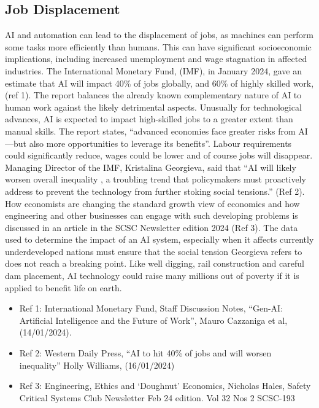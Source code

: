 \subsection{Job Displacement}
AI and automation can lead to the displacement of jobs, as machines can perform some tasks more efficiently than humans. This can have significant socioeconomic implications, including increased unemployment and wage stagnation in affected industries. The International Monetary Fund, (IMF), in January 2024, gave an estimate that AI will impact 40\% of jobs globally, and 60\% of highly skilled work, (ref 1). The report balances the already known complementary nature of AI to human work against the likely detrimental aspects. Unusually for technological advances, AI is expected to impact high-skilled jobs to a greater extent than manual skills. The report states, “advanced economies face greater risks from AI—but also more opportunities to leverage its benefits”. Labour requirements could significantly reduce, wages could be lower and of course jobs will disappear.  Managing Director of the IMF, Kristalina Georgieva, said that “AI will likely worsen overall inequality , a troubling trend that policymakers must proactively address to prevent the technology from further stoking social tensions.” (Ref 2). How economists are changing the standard growth view of economics and how engineering and other businesses can engage with such  developing problems is discussed in an article in the SCSC Newsletter edition 2024 (Ref 3). The data used to determine the impact of an AI system, especially when it affects currently underdeveloped nations must ensure that the social tension Georgieva refers to does not reach a breaking point. Like well digging, rail construction and careful dam placement, AI technology could raise many millions out of poverty if it is applied to benefit life on earth.

\begin{itemize}
\item Ref 1: International Monetary Fund, Staff Discussion Notes, “Gen-AI: Artificial Intelligence and the Future of Work”, Mauro Cazzaniga et al, (14/01/2024).
\item Ref 2: Western Daily Press, “AI to hit 40\% of jobs and will worsen inequality” Holly Williams, (16/01/2024) 
\item Ref 3: Engineering, Ethics and ‘Doughnut’ Economics, Nicholas Hales,  Safety Critical Systems Club Newsletter Feb 24 edition. Vol 32 Nos 2 SCSC-193
\end{itemize}

